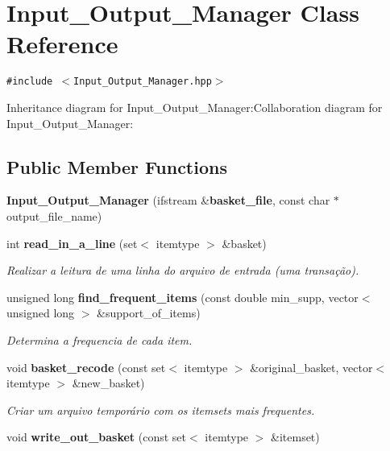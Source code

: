 \section{Input\_\-Output\_\-Manager Class Reference}
\label{classInput__Output__Manager}
{\tt \#include $<$Input\_\-Output\_\-Manager.hpp$>$}

Inheritance diagram for Input\_\-Output\_\-Manager:Collaboration diagram for Input\_\-Output\_\-Manager:\subsection*{Public Member Functions}
\begin{CompactItemize}
\item 
\textbf{Input\_\-Output\_\-Manager} (ifstream \&{\bf basket\_\-file}, const char $\ast$output\_\-file\_\-name)\label{classInput__Output__Manager_1e5c7811f3c8a9996d54451d411713ae}

\item 
int {\bf read\_\-in\_\-a\_\-line} (set$<$ itemtype $>$ \&basket)\label{classInput__Output__Manager_cf1d636c031a221338fffd430a2f09f4}

\begin{CompactList}\small\item\em Realizar a leitura de uma linha do arquivo de entrada (uma transação). \item\end{CompactList}\item 
unsigned long {\bf find\_\-frequent\_\-items} (const double min\_\-supp, vector$<$ unsigned long $>$ \&support\_\-of\_\-items)\label{classInput__Output__Manager_d1e82b140c9666e428c27eec6a270d64}

\begin{CompactList}\small\item\em Determina a frequencia de cada item. \item\end{CompactList}\item 
void {\bf basket\_\-recode} (const set$<$ itemtype $>$ \&original\_\-basket, vector$<$ itemtype $>$ \&new\_\-basket)\label{classInput__Output__Manager_94e6ee10dde867a1b9b63b18913e0a4f}

\begin{CompactList}\small\item\em Criar um arquivo temporário com os itemsets mais frequentes. \item\end{CompactList}\item 
void {\bf write\_\-out\_\-basket} (const set$<$ itemtype $>$ \&itemset)\label{classInput__Output__Manager_8e278d77f2e21a833f6c4d3c4b2cba1f}


\end{CompactItemize}
